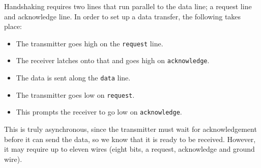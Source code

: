 Handshaking requires two lines that run parallel to the data line; a request
line and acknowledge line. In order to set up a data transfer, the following
takes place:

\begin{itemize}
	\item The transmitter goes high on the {\tt request} line.
	\item The receiver latches onto that and goes high on {\tt acknowledge}.
	\item The data is sent along the {\tt data} line.
	\item The transmitter goes low on {\tt request}.
	\item This prompts the receiver to go low on {\tt acknowledge}.
\end{itemize}

This is truly asynchronous, since the transmitter must wait for acknowledgement
before it can send the data, so we know that it is ready to be received.
However, it may require up to eleven wires (eight bits, a request, acknowledge
and ground wire).
